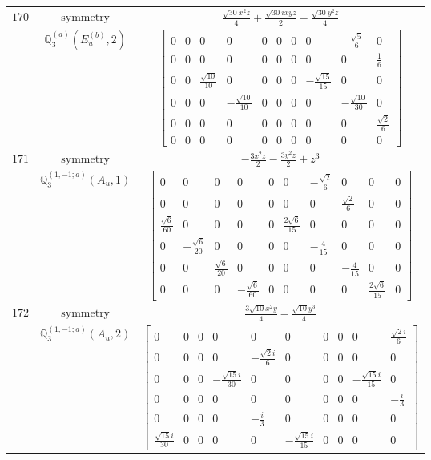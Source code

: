 \documentclass[fleqn,8pt,landscape]{jsarticle}
\begin{document}
\begin{longtable}{ccc}
$ 170 $ & $ \text{symmetry} $ & $ \frac{\sqrt{30} x^{2} z}{4} + \frac{\sqrt{30} i x y z}{2} - \frac{\sqrt{30} y^{2} z}{4} $ \\
$  $ & $ \mathbb{Q}_{3}^{(a)}(E_{u}^{(b)},2) $ & $ \begin{bmatrix} 0 & 0 & 0 & 0 & 0 & 0 & 0 & 0 & - \frac{\sqrt{5}}{6} & 0 \\ 0 & 0 & 0 & 0 & 0 & 0 & 0 & 0 & 0 & \frac{1}{6} \\ 0 & 0 & \frac{\sqrt{10}}{10} & 0 & 0 & 0 & 0 & - \frac{\sqrt{15}}{15} & 0 & 0 \\ 0 & 0 & 0 & - \frac{\sqrt{10}}{10} & 0 & 0 & 0 & 0 & - \frac{\sqrt{10}}{30} & 0 \\ 0 & 0 & 0 & 0 & 0 & 0 & 0 & 0 & 0 & \frac{\sqrt{2}}{6} \\ 0 & 0 & 0 & 0 & 0 & 0 & 0 & 0 & 0 & 0 \end{bmatrix} $ \\ \hline
$ 171 $ & $ \text{symmetry} $ & $ - \frac{3 x^{2} z}{2} - \frac{3 y^{2} z}{2} + z^{3} $ \\
$  $ & $ \mathbb{Q}_{3}^{(1,-1;a)}(A_{u},1) $ & $ \begin{bmatrix} 0 & 0 & 0 & 0 & 0 & 0 & - \frac{\sqrt{2}}{6} & 0 & 0 & 0 \\ 0 & 0 & 0 & 0 & 0 & 0 & 0 & \frac{\sqrt{2}}{6} & 0 & 0 \\ \frac{\sqrt{6}}{60} & 0 & 0 & 0 & 0 & \frac{2 \sqrt{6}}{15} & 0 & 0 & 0 & 0 \\ 0 & - \frac{\sqrt{6}}{20} & 0 & 0 & 0 & 0 & - \frac{4}{15} & 0 & 0 & 0 \\ 0 & 0 & \frac{\sqrt{6}}{20} & 0 & 0 & 0 & 0 & - \frac{4}{15} & 0 & 0 \\ 0 & 0 & 0 & - \frac{\sqrt{6}}{60} & 0 & 0 & 0 & 0 & \frac{2 \sqrt{6}}{15} & 0 \end{bmatrix} $ \\ \hline
$ 172 $ & $ \text{symmetry} $ & $ \frac{3 \sqrt{10} x^{2} y}{4} - \frac{\sqrt{10} y^{3}}{4} $ \\
$  $ & $ \mathbb{Q}_{3}^{(1,-1;a)}(A_{u},2) $ & $ \begin{bmatrix} 0 & 0 & 0 & 0 & 0 & 0 & 0 & 0 & 0 & \frac{\sqrt{2} i}{6} \\ 0 & 0 & 0 & 0 & - \frac{\sqrt{2} i}{6} & 0 & 0 & 0 & 0 & 0 \\ 0 & 0 & 0 & - \frac{\sqrt{15} i}{30} & 0 & 0 & 0 & 0 & - \frac{\sqrt{15} i}{15} & 0 \\ 0 & 0 & 0 & 0 & 0 & 0 & 0 & 0 & 0 & - \frac{i}{3} \\ 0 & 0 & 0 & 0 & - \frac{i}{3} & 0 & 0 & 0 & 0 & 0 \\ \frac{\sqrt{15} i}{30} & 0 & 0 & 0 & 0 & - \frac{\sqrt{15} i}{15} & 0 & 0 & 0 & 0 \end{bmatrix} $ \\ \hline

\end{longtable}
\end{document}
